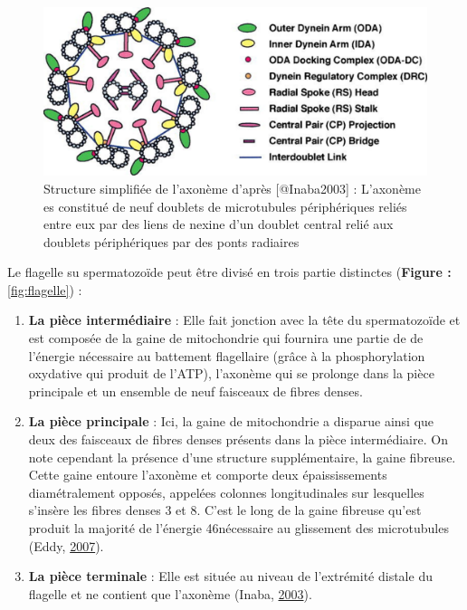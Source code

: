 \documentclass[12pt,twoside]{reedthesis}
\providecommand{\tightlist}{%
  \setlength{\itemsep}{0pt}\setlength{\parskip}{0pt}}
\theoremstyle{definition}
\theoremstyle{definition}
\theoremstyle{remark}
\begin{document}
  \begin{figure}
  
  {\centering \includegraphics[scale=.3]{figure/axoneme} 
  
  }
  
  \caption[Structure simplifiée de l'axonème]{Structure simplifiée de l'axonème d'après [@Inaba2003] : L'axonème es constitué de neuf doublets de microtubules périphériques reliés entre eux par des liens de nexine d'un doublet central relié aux doublets périphériques par des ponts radiaires}\label{fig:axoneme}
  \end{figure}
  
  Le flagelle su spermatozoïde peut être divisé en trois partie distinctes
  (\textbf{Figure : }\ref{fig:flagelle}) :
  
  \begin{enumerate}
  \def\labelenumi{\arabic{enumi}.}
  \tightlist
  \item
    \textbf{La pièce intermédiaire} : Elle fait jonction avec la tête du
    spermatozoïde et est composée de la gaine de mitochondrie qui fournira
    une partie de de l'énergie nécessaire au battement flagellaire (grâce
    à la phosphorylation oxydative qui produit de l'ATP), l'axonème qui se
    prolonge dans la pièce principale et un ensemble de neuf faisceaux de
    fibres denses.\\
  \item
    \textbf{La pièce principale} : Ici, la gaine de mitochondrie a
    disparue ainsi que deux des faisceaux de fibres denses présents dans
    la pièce intermédiaire. On note cependant la présence d'une structure
    supplémentaire, la gaine fibreuse. Cette gaine entoure l'axonème et
    comporte deux épaississements diamétralement opposés, appelées
    colonnes longitudinales sur lesquelles s'insère les fibres denses 3 et
    8. C'est le long de la gaine fibreuse qu'est produit la majorité de
    l'énergie 46nécessaire au glissement des microtubules (Eddy,
    \protect\hyperlink{ref-Eddy2007}{2007}).\\
  \item
    \textbf{La pièce terminale} : Elle est située au niveau de l'extrémité
    distale du flagelle et ne contient que l'axonème (Inaba,
    \protect\hyperlink{ref-Inaba2003}{2003}).
  \end{enumerate}
  
\end{document}
